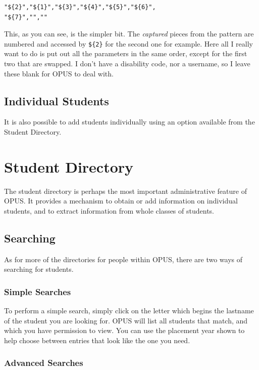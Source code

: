 \documentclass[12 pt]{book}
\begin{document}
\begin{lstlisting}
"${2}","${1}","${3}","${4}","${5}","${6}",
"${7}","",""
\end{lstlisting}

This, as you can see, is the simpler bit. The \emph{captured} pieces from the
pattern are numbered and accessed by \lstinline!${2}! for the second one for
example. Here all I really want to do is put out all the parameters in the
same order, except for the first two that are swapped. I don't have a disability
code, nor a username, so I leave these blank for OPUS to deal with.

\section{Individual Students}

It is also possible to add students individually using an option available from the Student
Directory.

\chapter{Student Directory}

The student directory is perhaps the most important administrative feature of OPUS. It provides
a mechanism to obtain or add information on individual students, and to extract information from
whole classes of students.

\section{Searching}

As for more of the directories for people within OPUS, there are two ways of
searching for students.

\subsection{Simple Searches}

To perform a simple search, simply click on the letter which begins the lastname
of the student you are looking for. OPUS will list all students that match, and
which you have permission to view. You can use the placement year shown to help
choose between entries that look like the one you need.

\subsection{Advanced Searches}
\end{document}
